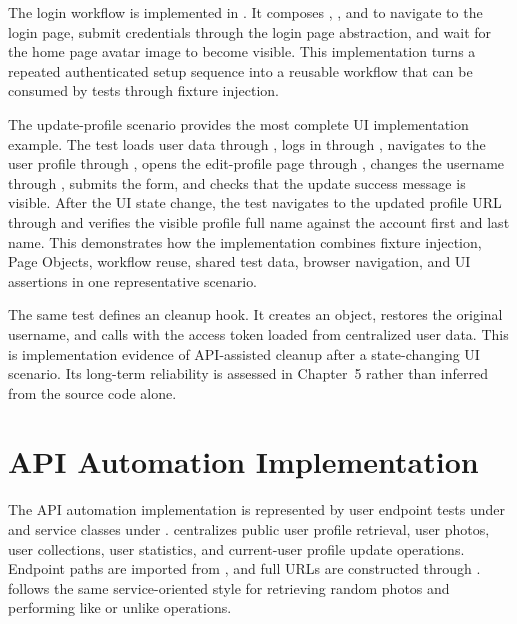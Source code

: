 The login workflow is implemented in . It composes , , and  to navigate to the login page, submit credentials through the login page abstraction, and wait for the home page avatar image to become visible. This implementation turns a repeated authenticated setup sequence into a reusable workflow that can be consumed by tests through fixture injection.

The update-profile scenario provides the most complete UI implementation example. The test loads user data through , logs in through , navigates to the user profile through , opens the edit-profile page through , changes the username through , submits the form, and checks that the update success message is visible. After the UI state change, the test navigates to the updated profile URL through  and verifies the visible profile full name against the account first and last name. This demonstrates how the implementation combines fixture injection, Page Objects, workflow reuse, shared test data, browser navigation, and UI assertions in one representative scenario.

The same test defines an  cleanup hook. It creates an  object, restores the original username, and calls  with the access token loaded from centralized user data. This is implementation evidence of API-assisted cleanup after a state-changing UI scenario. Its long-term reliability is assessed in Chapter~5 rather than inferred from the source code alone.

\section{API Automation Implementation}
\label{sec:ch4-api-automation-implementation}

The API automation implementation is represented by user endpoint tests under  and service classes under .  centralizes public user profile retrieval, user photos, user collections, user statistics, and current-user profile update operations. Endpoint paths are imported from , and full URLs are constructed through .  follows the same service-oriented style for retrieving random photos and performing like or unlike operations.

